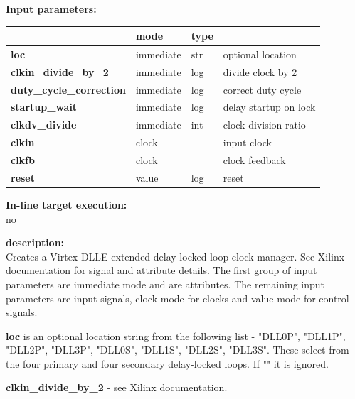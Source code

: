             {\bf Input parameters:} \\            
            \begin{tabular}{| l | l | l | l |}
            \hline
                           & mode  & type   & \\
            \hline \hline
            {\bf loc}                     & immediate & str   & optional location \\ \hline
            {\bf clkin\_divide\_by\_2}    & immediate & log   & divide clock by 2 \\ \hline
            {\bf duty\_cycle\_correction} & immediate & log   & correct duty cycle \\ \hline
            {\bf startup\_wait}           & immediate & log   & delay startup on lock \\ \hline
            {\bf clkdv\_divide}           & immediate & int   & clock division ratio \\ \hline
            {\bf clkin}                   & clock     &       & input clock \\ \hline
            {\bf clkfb}                   & clock     &       & clock feedback \\ \hline
            {\bf reset}                   & value     & log   & reset \\ \hline
            \end{tabular}

            {\bf In-line target execution:} \\
            no

            {\bf description:} \\
            Creates a Virtex DLLE extended delay-locked loop clock manager. See
            Xilinx documentation for signal and attribute details. The first group
            of input parameters are immediate mode and are attributes. The remaining
            input parameters are input signals, clock mode for clocks and value mode
            for control signals.


                {\bf loc} is an optional location string from the
                following list - "DLL0P", "DLL1P", "DLL2P", "DLL3P", "DLL0S", "DLL1S",
                "DLL2S", "DLL3S". These select from the four primary and four secondary
                delay-locked loops. If "" it is ignored.

                {\bf clkin\_divide\_by\_2} - see Xilinx documentation.

